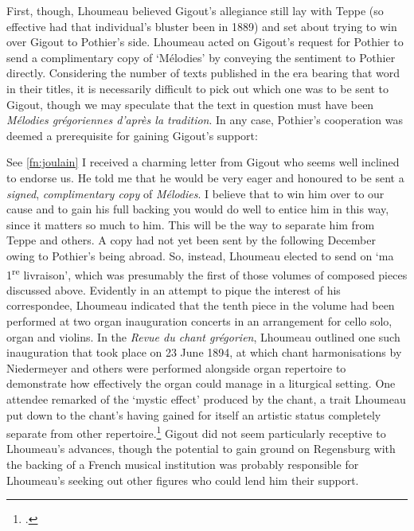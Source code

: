 First, though, Lhoumeau believed Gigout's allegiance still lay with Teppe (so effective had that individual's bluster been in 1889) and set about trying to win over Gigout to Pothier's side.
Lhoumeau acted on Gigout's request for Pothier to send a complimentary copy of `Mélodies' by conveying the sentiment to Pothier directly.
Considering the number of texts published in the era bearing that word in their titles, it is necessarily difficult to pick out which one was to be sent to Gigout, though we may speculate that the text in question must have been \emph{Mélodies grégoriennes d'après la tradition}.
In any case, Pothier's cooperation was deemed a prerequisite for gaining Gigout's support:

  {See \cref{fn:joulain}}
{I received a charming letter from Gigout who seems well inclined to endorse us.
He told me that he would be very eager and honoured to be sent a \emph{signed}, \emph{complimentary copy} of \emph{Mélodies}.
I believe that to win him over to our cause and to gain his full backing you would do well to entice him in this way, since it matters so much to him.
This will be the way to separate him from Teppe and others.}
\noindent
A copy had not yet been sent by the following December owing to Pothier's being abroad.
So, instead, Lhoumeau elected to send on `ma 1\textsuperscript{re} livraison', which was presumably the first of those volumes of composed pieces discussed above.
Evidently in an attempt to pique the interest of his correspondee, Lhoumeau indicated that the tenth piece in the volume had been performed at two organ inauguration concerts in an arrangement for cello solo, organ and violins.
In the \emph{Revue du chant grégorien}, Lhoumeau outlined one such inauguration that took place on 23 June 1894, at which chant harmonisations by Niedermeyer and others were performed alongside organ repertoire to demonstrate how effectively the organ could manage in a liturgical setting.
One attendee remarked of the `mystic effect' produced by the chant, a trait Lhoumeau put down to the chant's having gained for itself an artistic status completely separate from other repertoire.\footcite[196--7]{LhoumeauInaugurationorgue1894}
Gigout did not seem particularly receptive to Lhoumeau's advances, though the potential to gain ground on Regensburg with the backing of a French musical institution was probably responsible for Lhoumeau's seeking out other figures who could lend him their support.


